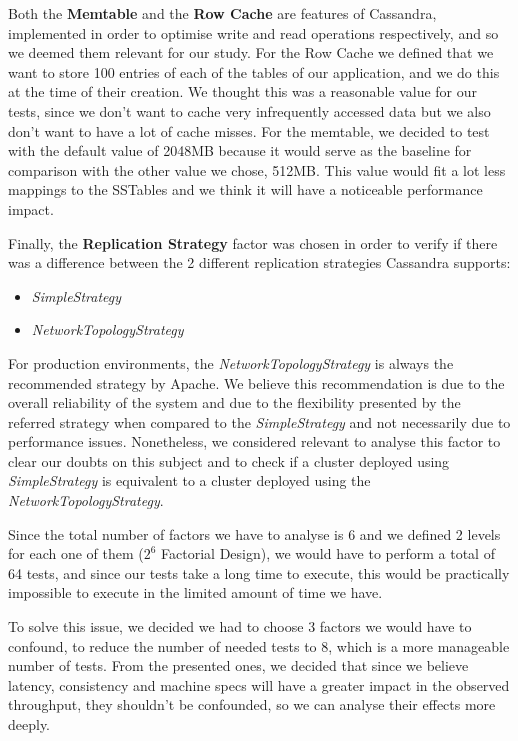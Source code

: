 \documentclass[runningheads]{llncs}
\begin{document}
Both the \textbf{Memtable} and the \textbf{Row Cache} are features of Cassandra, implemented in order to optimise write and read operations respectively, and so we deemed them relevant for our study. For the Row Cache we defined that we want to store 100 entries of each of the tables of our application, and we do this at the time of their creation. We thought this was a reasonable value for our tests, since we don't want to cache very infrequently accessed data but we also don't want to have a lot of cache misses.
For the memtable, we decided to test with the default value of 2048MB because it would serve as the baseline for comparison with the other value we chose, 512MB. This value would fit a lot less mappings to the SSTables and we think it will have a noticeable performance impact.

Finally, the \textbf{Replication Strategy} factor was chosen in order to verify if there was a difference between the 2 different replication strategies Cassandra supports:

\begin{itemize}
    \item \emph{SimpleStrategy}
    \item \emph{NetworkTopologyStrategy}
\end{itemize}

For production environments, the \emph{NetworkTopologyStrategy} is always the recommended strategy by Apache. We believe this recommendation is due to the overall reliability of the system and due to the flexibility presented by the referred strategy when compared to the \emph{SimpleStrategy} and not necessarily due to performance issues. Nonetheless, we considered relevant to analyse this factor to clear our doubts on this subject and to check if a cluster deployed using \emph{SimpleStrategy} is equivalent to a cluster deployed using the \emph{NetworkTopologyStrategy}.

Since the total number of factors we have to analyse is 6 and we defined 2 levels for each one of them ($2^6$ Factorial Design), we would have to perform a total of 64 tests, and since our tests take a long time to execute, this would be practically impossible to execute in the limited amount of time we have.

To solve this issue, we decided we had to choose 3 factors we would have to confound, to reduce the number of needed tests to 8, which is a more manageable number of tests. From the presented ones, we decided that since we believe latency, consistency and machine specs will have a greater impact in the observed throughput, they shouldn't be confounded, so we can analyse their effects more deeply.
\end{document}
